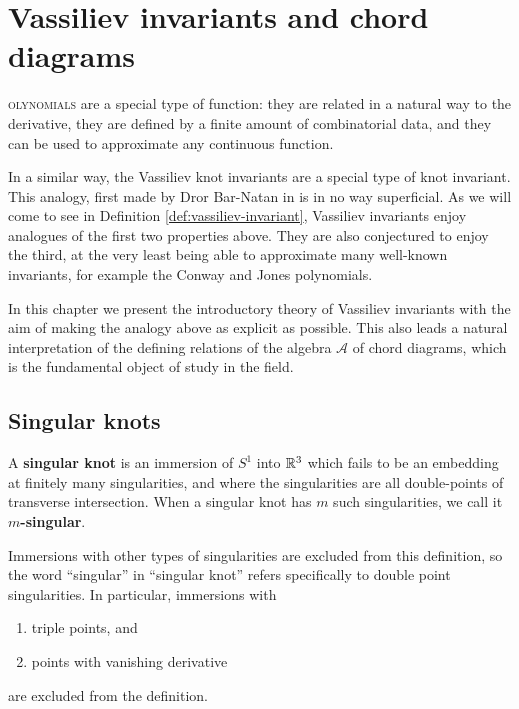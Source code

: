 \chapter{Vassiliev invariants and chord diagrams}
\label{ch:vassiliev-invariants-and-chord-diagrams}

\lettrine{}{olynomials} are a special type of function: they are related in a natural way to the derivative, they are defined by a finite amount of combinatorial data, and they can be used to approximate any continuous function.

In a similar way, the Vassiliev knot invariants are a special type of knot invariant. This analogy, first made by Dror Bar-Natan in \cite{on-the-vassiliev-knot-invariants} is in no way superficial. As we will come to see in Definition \ref{def:vassiliev-invariant}, Vassiliev invariants enjoy analogues of the first two properties above. They are also conjectured to enjoy the third, at the very least being able to approximate many well-known invariants, for example the Conway and Jones polynomials.

In this chapter we present the introductory theory of Vassiliev invariants with the aim of making the analogy above as explicit as possible. This also leads a natural interpretation of the defining relations of the algebra \(\mathcal{A}\) of chord diagrams, which is the fundamental object of study in the field.

\section{Singular knots}
\label{sec:singular-knots}

\begin{definition}
	A \textbf{singular knot} is an immersion of \(S^{1}\) into \(\mathbb{R}^{3}\) which fails to be an embedding at finitely many singularities, and where the singularities are all double-points of transverse intersection. When a singular knot has \(m\) such singularities, we call it \textbf{\(m\)-singular}.
\end{definition}

\begin{remark}
	\label{rem:other-singularities}
	Immersions with other types of singularities are excluded from this definition, so the word ``singular'' in ``singular knot'' refers specifically to double point singularities. In particular, immersions with
	\begin{enumerate}
		\item triple points, and
		\item points with vanishing derivative
	\end{enumerate}
	are excluded from the definition.
\end{remark}

